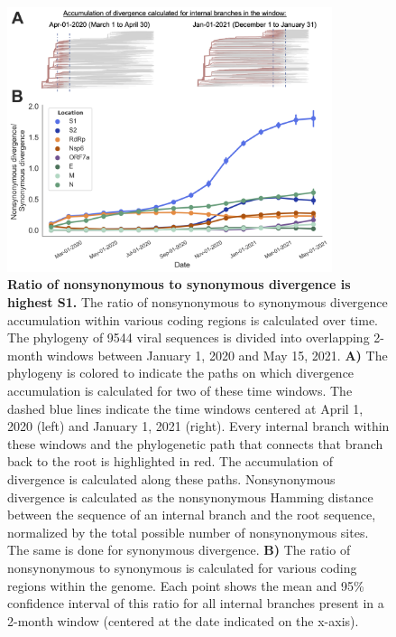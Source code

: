 \documentclass[11pt,oneside,letterpaper]{article}
\begin{document}
\begin{figure}[h!]
	\centerline{\includegraphics[width=0.85\textwidth]{fig2_dnds.png}}
	\caption{\textbf{Ratio of nonsynonymous to synonymous divergence is highest S1.}
	The ratio of nonsynonymous to synonymous divergence accumulation within various coding regions is calculated over time.
	The phylogeny of 9544 viral sequences is divided into overlapping 2-month windows between January 1, 2020 and May 15, 2021.
	\textbf{A)} The phylogeny is colored to indicate the paths on which divergence accumulation is calculated for two of these time windows.
	The dashed blue lines indicate the time windows centered at April 1, 2020 (left) and January 1, 2021 (right).
	Every internal branch within these windows and the phylogenetic path that connects that branch back to the root is highlighted in red.
	The accumulation of divergence is calculated along these paths.
	Nonsynonymous divergence is calculated as the nonsynonymous Hamming distance between the sequence of an internal branch and the root sequence, normalized by the total possible number of nonsynonymous sites.
	The same is done for synonymous divergence.
	\textbf{B)} The ratio of nonsynonymous to synonymous is calculated for various coding regions within the genome.
	Each point shows the mean and 95\% confidence interval of this ratio for all internal branches present in a 2-month window (centered at the date indicated on the x-axis).
	}
	\label{fig:dnds}
\end{figure}
\end{document}
